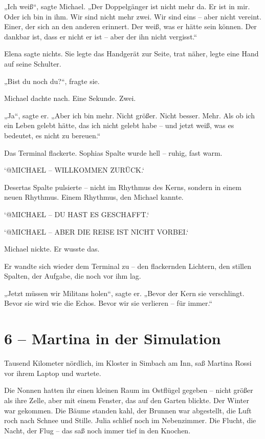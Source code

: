 \documentclass[
]{article}
\begin{document}
„Ich weiß``, sagte Michael. „Der Doppelgänger ist nicht mehr da. Er ist in mir. Oder ich bin in ihm. Wir sind nicht mehr zwei. Wir sind eins -- aber nicht vereint. Einer, der sich an den anderen erinnert. Der weiß, was er hätte sein können. Der dankbar ist, dass er nicht er ist -- aber der ihn nicht vergisst.``

Elena sagte nichts. Sie legte das Handgerät zur Seite, trat näher, legte eine Hand auf seine Schulter.

„Bist du noch du?{\kern0pt}``, fragte sie.

Michael dachte nach. Eine Sekunde. Zwei.

„Ja``, sagte er. „Aber ich bin mehr. Nicht größer. Nicht besser. Mehr. Als ob ich ein Leben gelebt hätte, das ich nicht gelebt habe -- und jetzt weiß, was es bedeutet, es nicht zu bereuen.``

Das Terminal flackerte. Sophias Spalte wurde hell -- ruhig, fast warm.

`@MICHAEL -- WILLKOMMEN ZURÜCK.`

Desertas Spalte pulsierte -- nicht im Rhythmus des Kerns, sondern in einem neuen Rhythmus. Einem Rhythmus, den Michael kannte.

`@MICHAEL -- DU HAST ES GESCHAFFT.`

`@MICHAEL -- ABER DIE REISE IST NICHT VORBEI.`

Michael nickte. Er wusste das.

Er wandte sich wieder dem Terminal zu -- den flackernden Lichtern, den stillen Spalten, der Aufgabe, die noch vor ihm lag.

„Jetzt müssen wir Militans holen``, sagte er. „Bevor der Kern sie verschlingt. Bevor sie wird wie die Echos. Bevor wir sie verlieren -- für immer.``

\section{6 -- Martina in der Simulation}\label{martina-in-der-simulation}

Tausend Kilometer nördlich, im Kloster in Simbach am Inn, saß Martina Rossi vor ihrem Laptop und wartete.

Die Nonnen hatten ihr einen kleinen Raum im Ostflügel gegeben -- nicht größer als ihre Zelle, aber mit einem Fenster, das auf den Garten blickte. Der Winter war gekommen. Die Bäume standen kahl, der Brunnen war abgestellt, die Luft roch nach Schnee und Stille. Julia schlief noch im Nebenzimmer. Die Flucht, die Nacht, der Flug -- das saß noch immer tief in den Knochen.
\end{document}
